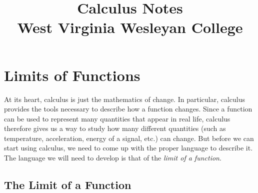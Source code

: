 \documentclass[10pt,]{book}
\title{Calculus Notes\\
{\large West Virginia Wesleyan College}}
\author{}
\date{}
\theoremstyle{ptxplainnotitle}
\theoremstyle{ptxplaintitle}
\theoremstyle{ptxplainnotitle}
\theoremstyle{ptxplaintitle}
\theoremstyle{ptxplainnotitle}
\theoremstyle{ptxplaintitle}
\theoremstyle{ptxdefinitionnotitle}
\theoremstyle{ptxdefinitiontitle}
\theoremstyle{ptxdefinitionnotitle}
\theoremstyle{ptxdefinitiontitle}
\theoremstyle{ptxdefinitionnotitle}
\theoremstyle{ptxdefinitiontitle}
\theoremstyle{ptxdefinitionnotitle}
\theoremstyle{ptxdefinitiontitle}
\theoremstyle{ptxdefinitionnotitle}
\theoremstyle{ptxdefinitiontitle}
\numberwithin{equation}{section}
\begin{document}
\typeout{************************************************}
\typeout{************************************************}
\chapter[{Limits of Functions}]{Limits of Functions}\label{limits}
\hypertarget{p-1}{}%
At its heart, calculus is just the mathematics of change. In particular, calculus provides the tools necessary to describe how a function changes. Since a function can be used to represent many quantities that appear in real life, calculus therefore gives us a way to study how many different quantities (such as temperature, acceleration, energy of a signal, etc.) can change. But before we can start using calculus, we need to come up with the proper language to describe it. The language we will need to develop is that of the \emph{limit of a function}.%
\typeout{************************************************}
\typeout{************************************************}
\section[{The Limit of a Function}]{The Limit of a Function}\label{section-the-limit-of-a-function}
\typeout{************************************************}
\typeout{************************************************}
\end{document}
